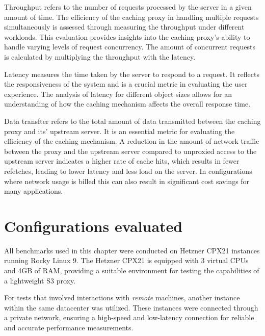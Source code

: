 \begin{description}[style=nextline]
\item[Throughput] Throughput refers to the number of requests processed by the server in a given amount of time. The efficiency of the caching proxy in handling multiple requests simultaneously is assessed through measuring the throughput under different workloads. This evaluation provides insights into the caching proxy's ability to handle varying levels of request concurrency. The amount of concurrent requests is calculated by multiplying the throughput with the latency.

\item[Latency] Latency measures the time taken by the server to respond to a request. It reflects the responsiveness of the system and is a crucial metric in evaluating the user experience. The analysis of latency for different object sizes allows for an understanding of how the caching mechanism affects the overall response time.

\item[Data transfer] Data transfter refers to the total amount of data transmitted between the caching proxy and its' upstream server. It is an essential metric for evaluating the efficiency of the caching mechanism. A reduction in the amount of network traffic between the proxy and the upstream server compared to unproxied access to the upstream server indicates a higher rate of cache hits, which results in fewer refetches, leading to lower latency and less load on the server. In configurations where network usage is billed this can also result in significant cost savings for many applications.

\end{description}

\section{Configurations evaluated}

All benchmarks used in this chapter were conducted on Hetzner CPX21 instances running Rocky Linux 9. The Hetzner CPX21 is equipped with 3 virtual CPUs and 4GB of RAM, providing a suitable environment for testing the capabilities of a lightweight S3 proxy.

For tests that involved interactions with \textit{remote} machines, another instance within the same datacenter was utilized. These instances were connected through a private network, ensuring a high-speed and low-latency connection for reliable and accurate performance measurements.

